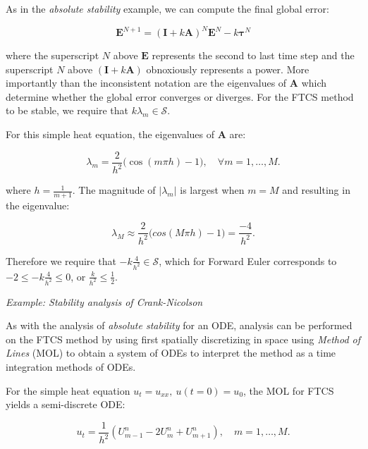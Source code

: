 \begin{tcolorbox}[colback=yellow!5!white,colframe=yellow!75!black]
    As in the \textit{absolute stability} example, we can compute the final global error: 
    
    \begin{equation}
        \boldsymbol{E}^{N+1} = (\boldsymbol{I} + k \boldsymbol{A})^N \boldsymbol{E}^N - k \boldsymbol{\tau}^N
    \end{equation}

    where the superscript $N$ above $\boldsymbol{E}$ represents the second to last time step and the superscript $N$ above $(\boldsymbol{I} + k \boldsymbol{A})$ obnoxiously represents a power. More importantly than the inconsistent notation are the eigenvalues of $\boldsymbol{A}$ which determine whether the global error converges or diverges. For the FTCS method to be stable, we require that $k \lambda_m \in \mathcal{S}$.

    For this simple heat equation, the eigenvalues of $\boldsymbol{A}$ are: 

    \begin{equation}
        \lambda_m = \frac{2}{h^2} \big(\cos(m\pi h) - 1\big),\quad \forall m = 1, \dots, M. 
    \end{equation}

    where $h = \frac{1}{m+1}$. The magnitude of $|\lambda_m|$ is largest when $m = M$ and resulting in the eigenvalue: 
    
    \begin{equation}
        \lambda_M \approx \frac{2}{h^2}\big(cos(M \pi h) - 1\big) = \frac{-4}{h^2}.  
    \end{equation}

    Therefore we require that $-k\frac{4}{h^2} \in \mathcal{S}$, which for Forward Euler corresponds to $-2 \leq -k\frac{4}{h^2} \leq 0$, or $\frac{k}{h^2} \leq \frac{1}{2}$.
    
\end{tcolorbox}

\vspace{0.5cm}
\begin{tcolorbox}[colback=yellow!5!white,colframe=yellow!75!black]
    \textit{Example: Stability analysis of Crank-Nicolson}
    \vspace{0.25cm}

    As with the analysis of \textit{absolute stability} for an ODE, analysis can be performed on the FTCS method by using first spatially discretizing in space using \textit{Method of Lines} (MOL) to obtain a system of ODEs to interpret the method as a time integration methods of ODEs. 

    For the simple heat equation $u_t = u_{xx}, \ u(t=0) = u_0$, the MOL for FTCS yields a semi-discrete ODE: 

    \begin{equation}
        u_t = \frac{1}{h^2}(U_{m-1}^{n} - 2U_{m}^{n} + U_{m+1}^n), \quad m = 1, \dots, M. 
    \end{equation}

    
\end{tcolorbox}

